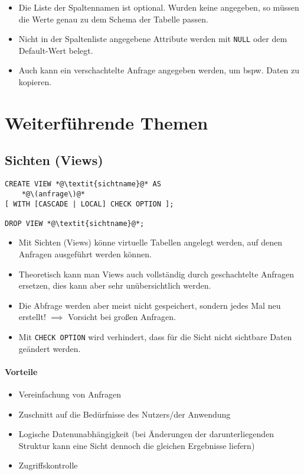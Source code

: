 \documentclass[a4paper, 11pt, accentcolor = tud3b]{tudreport}
\begin{document}
                \begin{itemize}
                	\item Die Liste der Spaltennamen ist optional. Wurden keine angegeben, so müssen die Werte genau zu dem Schema der Tabelle passen.
                	\item Nicht in der Spaltenliste angegebene Attribute werden mit \lstinline|NULL| oder dem Default-Wert belegt.
                	\item Auch kann ein verschachtelte Anfrage angegeben werden, um bspw. Daten zu kopieren.
                \end{itemize}

        \section{Weiterführende Themen} %
            \subsection{Sichten (Views)} %
            	\begin{lstlisting}
CREATE VIEW *@\textit{sichtname}@* AS
	*@\(anfrage\)@*
[ WITH [CASCADE | LOCAL] CHECK OPTION ];

DROP VIEW *@\textit{sichtname}@*;
            	\end{lstlisting}
            	
            	\begin{itemize}
            		\item Mit Sichten (Views) könne virtuelle Tabellen angelegt werden, auf denen Anfragen ausgeführt werden können.
            		\item Theoretisch kann man Views auch vollständig durch geschachtelte Anfragen ersetzen, dies kann aber sehr unübersichtlich werden.
            		\item Die Abfrage werden aber meist nicht gespeichert, sondern jedes Mal neu erstellt! \(\implies\) Vorsicht bei großen Anfragen.
            		\item Mit \lstinline|CHECK OPTION| wird verhindert, dass für die Sicht nicht sichtbare Daten geändert werden.
            	\end{itemize}
            
            	\paragraph{Vorteile}
            		\begin{itemize}
            			\item Vereinfachung von Anfragen
            			\item Zuschnitt auf die Bedürfnisse des Nutzers/der Anwendung
            			\item Logische Datenunabhängigkeit (bei Änderungen der darunterliegenden Struktur kann eine Sicht dennoch die gleichen Ergebnisse liefern)
            			\item Zugriffskontrolle
            		\end{itemize}
            	
\end{document}
